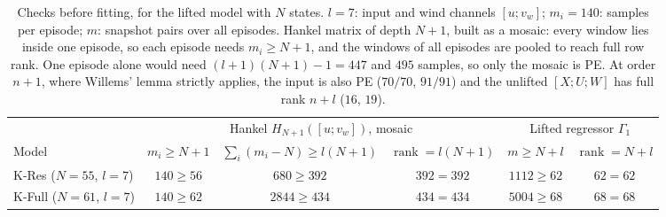 \documentclass[11pt,a4paper]{article}
\newcommand{\KRes}{\textsf{K-Res}}            %
\newcommand{\KFull}{\textsf{K-Full}}          %
\begin{document}
	\begin{table}[ht]
		\centering
		\caption{Checks before fitting, for the lifted model with $N$ states. $l = 7$: input and wind
			channels $[u; v_w]$; $m_i = 140$: samples per episode; $m$: snapshot pairs over all episodes.
			Hankel matrix of depth $N+1$, built as a mosaic: every window lies inside one episode, so each
			episode needs $m_i \ge N+1$, and the windows of all episodes are pooled to reach full row rank.
			One episode alone would need $(l+1)(N+1) - 1 = 447$ and $495$ samples, so only the mosaic is PE.
			At order $n+1$, where Willems' lemma strictly applies, the input is also PE ($70/70$, $91/91$)
			and the unlifted $[X; U; W]$ has full rank $n + l$ ($16$, $19$).}
		\label{tab:gamma-rank}
		\footnotesize
		\setlength{\tabcolsep}{4pt}
		\begin{tabular}{@{}lccccc@{}}
			\toprule
			& \multicolumn{3}{c}{Hankel $H_{N+1}([u; v_w])$, mosaic} & \multicolumn{2}{c}{Lifted regressor $\Gamma_1$} \\
			\cmidrule(lr){2-4} \cmidrule(l){5-6}
			Model & $m_i \ge N+1$ & $\sum_i (m_i - N) \ge l(N+1)$ & $\operatorname{rank} = l(N+1)$
			& $m \ge N + l$ & $\operatorname{rank} = N + l$ \\
			\midrule
			\KRes{} ($N = 55$, $l = 7$)  & $140 \ge 56$ & $680 \ge 392$  & $392 = 392$ & $1112 \ge 62$ & $62 = 62$ \\
			\KFull{} ($N = 61$, $l = 7$) & $140 \ge 62$ & $2844 \ge 434$ & $434 = 434$ & $5004 \ge 68$ & $68 = 68$ \\
			\bottomrule
		\end{tabular}
	\end{table}
\end{document}
